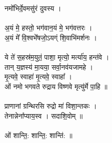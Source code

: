नमो᳚भिर्दे॒वमसु॑रं दुवस्य ।\\
\\
अ॒यं मे॒ हस्तो॒ भग॑वान॒यं मे॒ भग॑वत्तरः ।\\
अ॒यं मे᳚ वि॒श्वभे᳚षजो॒ऽयग्ं शि॒वाभि॑मर्शनः ।\\
\\
ये ते॑ स॒हस्र॑म॒युतं॒ पाशा॒ मृत्यो॒ मर्त्या॑य॒ हन्त॑वे ।\\
तान् य॒ज्ञस्य॑ मा॒यया॒ सर्वा॒नव॑यजामहे ।\\
मृ॒त्यवे॒ स्वाहा॑ मृ॒त्यवे॒ स्वाहा᳚ ।\\
ओं नमो भगवते रुद्राय विष्णवे मृत्यु॑र्मे पा॒हि ॥\\
\\
प्राणानां ग्रन्थिरसि रुद्रो मा॑ विशा॒न्तकः ।\\
तेनान्नेना᳚प्याय॒स्व । सदाशि॒वोम् ॥\\
\\
ओं शान्ति॒: शान्ति॒: शान्ति॑: ॥\\
